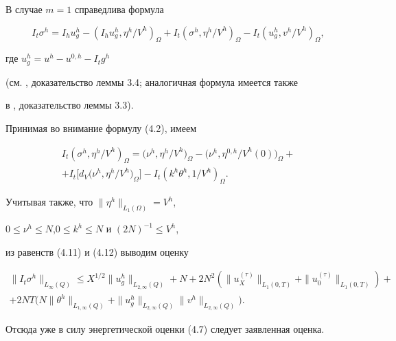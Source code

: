 \documentclass[12pt]{article}
\theoremstyle{plain} %
\theoremstyle{definition}
\numberwithin{equation}{section}
\begin{document}
\begin{pf} В случае $m=1$ справедлива формула


\begin{equation}


I_t\sigma^h = I_hu^h_g - (I_hu^h_g,\eta^h/V^h)_\Omega +


I_t(\sigma^h,\eta^h/V^h)_\Omega - I_t(u^h_g,v^h/V^h)_\Omega,


\end{equation}


где $u_g^h=u^h-u^{0,h}-I_tg^h$


(см. \cite{Amo9}, доказательство леммы 3.4; аналогичная формула имеется также


в \cite{Amo7}, доказательство леммы 3.3).





Принимая во внимание формулу (4.2), имеем


\begin{multline}


I_t(\sigma^h,\eta^h/V^h)_\Omega =


\bigl(\nu^h,\eta^h/{V^h}\bigr)_\Omega -


\bigl(\nu^h,\eta^{0,h}/V^h(0)\bigr)_\Omega +\\


%


+I_t\bigl[d_V(\nu^h,\eta^h/{V^h}\bigr)_\Omega\bigr] -


I_t(k^h\theta^h,1/V^h)_\Omega.


\end{multline}


Учитывая также, что $\|\eta^h\|_{L_1(\Omega)} = V^h$,


$0\le\nu^h\le N$,$0\le k^h\le N$ и $(2N)^{-1}\le V^h$,


из равенств (4.11) и (4.12) выводим оценку


\begin{multline*}


\|I_t\sigma^h\|_{L_\infty(Q)}


\le X^{1/2}\|u^h_g\|_{L_{2,\infty}(Q)} + N +


2N^2(\|u^{(\tau)}_X\|_{L_1(0,T)}+\|u^{(\tau)}_0\|_{L_1(0,T)}) +\\


+2NT\bigl(N\|\theta^h\|_{L_{1,\infty}(Q)}+


\|u^h_g\|_{L_{2,\infty}(Q)}\|v^h\|_{L_{2,\infty}(Q)}\bigr).


\end{multline*}


Отсюда уже в силу энергетической оценки (4.7) следует заявленная оценка.


\end{pf}
\end{document}
